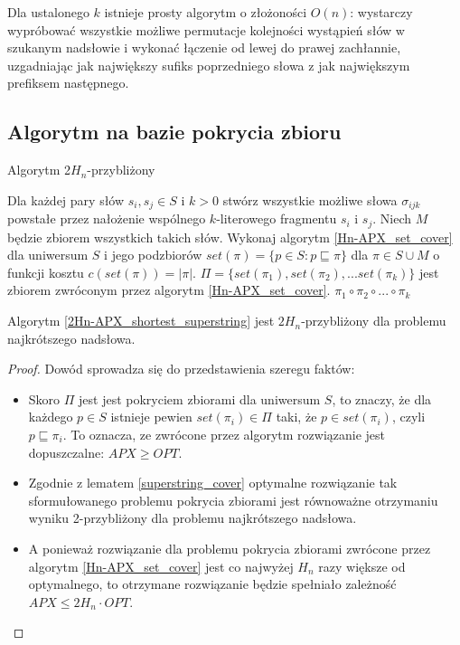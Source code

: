 Dla ustalonego $k$ istnieje prosty algorytm o złożoności $O(n)$: wystarczy wypróbować wszystkie możliwe permutacje kolejności wystąpień słów w szukanym nadsłowie i wykonać łączenie od lewej do prawej zachłannie, uzgadniając jak największy sufiks poprzedniego słowa z jak największym prefiksem następnego.

\subsection{Algorytm na bazie pokrycia zbioru}

\begin{algorithm}
\caption{Algorytm 2$H_n$-przybliżony}
\label{2Hn-APX_shortest_superstring}
\begin{algorithmic}
\State Dla każdej pary słów $s_i, s_j \in S$ i $k > 0$ stwórz wszystkie możliwe słowa $\sigma_{ijk}$ powstałe przez nałożenie wspólnego $k$-literowego fragmentu $s_i$ i $s_j$. Niech $M$ będzie zbiorem wszystkich takich słów.
\State Wykonaj algorytm \ref{Hn-APX_set_cover} dla uniwersum $S$ i jego podzbiorów $set(\pi) = \{p \in S: p \sqsubseteq \pi\}$ dla $\pi \in S \cup M$ o funkcji kosztu $c(set(\pi)) = |\pi|$.
\State $\Pi = \{set(\pi_1), set(\pi_2), ... set(\pi_k)\}$ jest zbiorem zwróconym przez algorytm \ref{Hn-APX_set_cover}.
\Return $\pi_1 \circ \pi_2 \circ ... \circ \pi_k$
\end{algorithmic}
\end{algorithm}

\begin{theorem}
Algorytm \ref{2Hn-APX_shortest_superstring} jest $2H_n$-przybliżony dla problemu najkrótszego nadsłowa.
\end{theorem}
\begin{proof}
Dowód sprowadza się do przedstawienia szeregu faktów:
\begin{itemize}
\item Skoro $\Pi$ jest jest pokryciem zbiorami dla uniwersum $S$, to znaczy, że dla każdego $p \in S$ istnieje pewien $set(\pi_i) \in \Pi$ taki, że $p \in set(\pi_i)$, czyli $p \sqsubseteq \pi_i$. To oznacza, ze zwrócone przez algorytm rozwiązanie jest dopuszczalne: $APX \geq OPT$.
\item Zgodnie z lematem \ref{superstring_cover} optymalne rozwiązanie tak sformułowanego problemu pokrycia zbiorami jest równoważne otrzymaniu wyniku 2-przybliżony dla problemu najkrótszego nadsłowa.
\item A ponieważ rozwiązanie dla problemu pokrycia zbiorami zwrócone przez algorytm \ref{Hn-APX_set_cover} jest co najwyżej $H_n$ razy większe od optymalnego, to otrzymane rozwiązanie będzie spełniało zależność $APX \leq 2H_n \cdot OPT$.
\end{itemize}
\end{proof}

